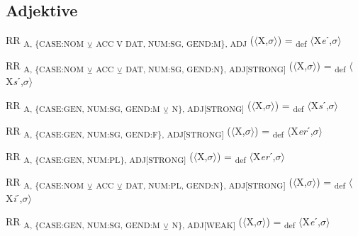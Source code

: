 {\subsection{Adjektive}

\begin{exe}
 RR \textsubscript{A, \{CASE:NOM} \textsubscript{${\veebar}$}\textsubscript{ ACC V DAT, NUM:SG, GEND:M\}, ADJ} ($\langle$X,$\sigma $$\rangle$) = \textsubscript{def} $\langle$X\textit{e}ˊ,$\sigma $$\rangle$
\end{exe}

\begin{exe}
 RR \textsubscript{A, \{CASE:NOM} \textsubscript{${\veebar}$}\textsubscript{ ACC} \textsubscript{${\veebar}$}\textsubscript{ DAT, NUM:SG, GEND:N\}, ADJ[STRONG]} ($\langle$X,$\sigma $$\rangle$) = \textsubscript{def} $\langle$X\textit{s}ˊ,$\sigma $$\rangle$
\end{exe}

\begin{exe}
 RR \textsubscript{A, \{CASE:GEN, NUM:SG, GEND:M} \textsubscript{${\veebar}$}\textsubscript{ N\}, ADJ[STRONG]} ($\langle$X,$\sigma $$\rangle$) = \textsubscript{def} $\langle$X\textit{s}ˊ,$\sigma $$\rangle$
\end{exe}

\begin{exe}
 RR \textsubscript{A, \{CASE:GEN, NUM:SG, GEND:F\}, ADJ[STRONG]} ($\langle$X,$\sigma $$\rangle$) = \textsubscript{def} $\langle$X\textit{er}ˊ,$\sigma $$\rangle$
\end{exe}

\begin{exe}
 RR \textsubscript{A, \{CASE:GEN, NUM:PL\}, ADJ[STRONG]} ($\langle$X,$\sigma $$\rangle$) = \textsubscript{def} $\langle$X\textit{er}ˊ,$\sigma $$\rangle$
\end{exe}

\begin{exe}
 RR \textsubscript{A, \{CASE:NOM} \textsubscript{${\veebar}$}\textsubscript{ ACC} \textsubscript{${\veebar}$}\textsubscript{ DAT, NUM:PL, GEND:N\}, ADJ[STRONG]} ($\langle$X,$\sigma $$\rangle$) = \textsubscript{def} $\langle$X\textit{i}ˊ,$\sigma $$\rangle$
\end{exe}

\begin{exe}
 RR \textsubscript{A, \{CASE:GEN, NUM:SG, GEND:M} \textsubscript{${\veebar}$}\textsubscript{ N\}, ADJ[WEAK]} ($\langle$X,$\sigma $$\rangle$) = \textsubscript{def} $\langle$X\textit{e}ˊ,$\sigma $$\rangle$
\end{exe}

}
